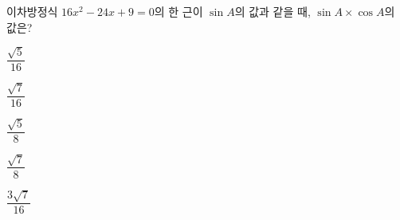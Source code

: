 이차방정식 $16x^2-24x+9=0$의 한 근이 $\sin A$의 값과 같을 때, $\sin A\times\cos A$의 값은? 
\begin{choices32}{\rule[-3ex]{0pt}{8ex}$\dfrac{\sqrt{5}}{16}$}{\rule[-3ex]{0pt}{8ex}$\dfrac{\sqrt{7}}{16}$}{\rule[-3ex]{0pt}{8ex}$\dfrac{\sqrt{5}}{8}$}{\rule[-3ex]{0pt}{8ex}$\dfrac{\sqrt{7}}{8}$}{\rule[-3ex]{0pt}{8ex}$\dfrac{3\sqrt{7}}{16}$}\end{choices32}
